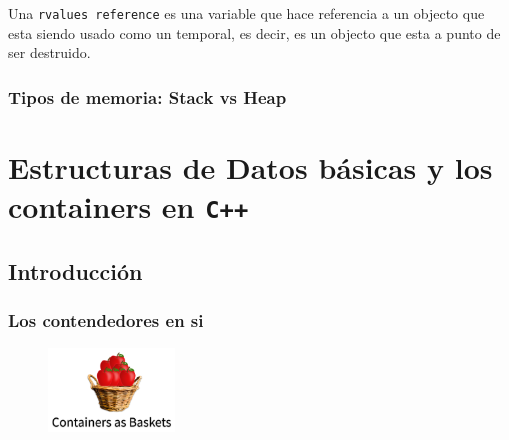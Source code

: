 \documentclass[12pt, fleqn]{report}                             %
\theoremstyle{break}                                            %
\newcommand{\textCode}[1]  { \texttt{#1} }                      %
\newcommand{\Cpp}{\ignorespaces\textCode{C++}}                  %
\begin{document}
                Una \textCode{rvalues reference} es una variable que hace referencia a un objecto que esta siendo usado
                como un temporal, es decir, es un objecto que esta a punto de ser destruido.
                

        \clearpage
        \section{Tipos de memoria: Stack vs Heap} 



\part{Estructuras de Datos básicas y los containers  en \Cpp}
\label{part:EstructurasDeDatosBasicas}

    \clearpage
    \chapter{Introducción}

        \clearpage
        \section{Los contendedores en si}

            \begin{figure}
                \centering
                \includegraphics[width=0.3\textwidth]{ContainerBaskets}
            \end{figure}
\end{document}
